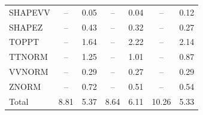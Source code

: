 \begin{table}[H]
\begin{center}
\begin{footnotesize}
\begin{tabular}{lcccccc}
				SHAPEVV & -- &  0.05 & -- &  0.04 & -- &  0.12 \\
				SHAPEZ & -- &  0.43 & -- &  0.32 & -- &  0.27 \\
				TOPPT & -- &  1.64 & -- &  2.22 & -- &  2.14 \\
				TTNORM & -- &  1.25 & -- &  1.01 & -- &  0.87 \\
				VVNORM & -- &  0.29 & -- &  0.27 & -- &  0.29 \\
				ZNORM & -- &  0.72 & -- &  0.51 & -- &  0.54 \\
				Total &  8.81  &  5.37 &  8.64  &  6.11 &  10.26  &  5.33 \\ \hline \hline
			\end{tabular}
			\label{tab:SysUncertainties_700}
        \end{footnotesize}
	\end{center}
\end{table}


